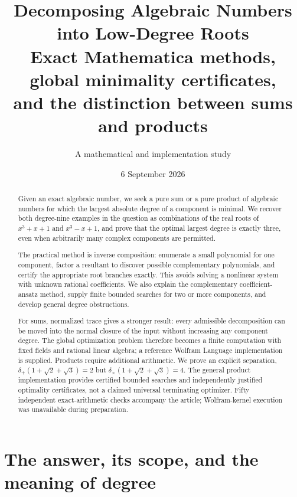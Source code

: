\documentclass[11pt,letterpaper]{article}
\title{\bfseries Decomposing Algebraic Numbers\\into Low-Degree Roots\vspace{5pt}\\
\large Exact Mathematica methods, global minimality certificates,\\and the distinction between sums and products}
\author{A mathematical and implementation study}
\date{6 September 2026}
\theoremstyle{definition}
\newcommand{\dplus}{\delta_{+}}
\newcommand{\dtimes}{\delta_{\times}}
\begin{document}
\maketitle
\begin{abstract}
Given an exact algebraic number, we seek a pure sum or a pure product of algebraic numbers for which the largest absolute degree of a component is minimal. We recover both degree-nine examples in the question as combinations of the real roots of $x^3+x+1$ and $x^3-x+1$, and prove that the optimal largest degree is exactly three, even when arbitrarily many complex components are permitted.

The practical method is inverse composition: enumerate a small polynomial for one component, factor a resultant to discover possible complementary polynomials, and certify the appropriate root branches exactly. This avoids solving a nonlinear system with unknown rational coefficients. We also explain the complementary coefficient-ansatz method, supply finite bounded searches for two or more components, and develop general degree obstructions.

For sums, normalized trace gives a stronger result: every admissible decomposition can be moved into the normal closure of the input without increasing any component degree. The global optimization problem therefore becomes a finite computation with fixed fields and rational linear algebra; a reference Wolfram Language implementation is supplied. Products require additional arithmetic. We prove an explicit separation, $\dplus(1+\sqrt2+\sqrt3)=2$ but $\dtimes(1+\sqrt2+\sqrt3)=4$. The general product implementation provides certified bounded searches and independently justified optimality certificates, not a claimed universal terminating optimizer. Fifty independent exact-arithmetic checks accompany the article; Wolfram-kernel execution was unavailable during preparation.
\end{abstract}

\newpage
\begingroup
\small
\setlength{\parskip}{0pt}
\tableofcontents
\endgroup
\newpage

\section{The answer, its scope, and the meaning of degree}
\end{document}
